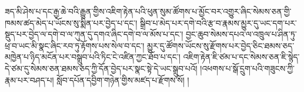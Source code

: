 ཟད་མི་ཤེས་པ་དང་རྒྱ་ཆེ་བའི་རྒྱུན་གྱིས་འཇིག་རྟེན་པའི་ཕུན་སུམ་ཚོགས་པ་མྱོང་བར་འགྱུར་ཞིང་སེམས་ཅན་གྱི་ཁམས་ཚད་མེད་པ་ཡོངས་སུ་སྨིན་པར་བྱེད་པ་དང་། སྒྲིབ་པ་མེད་པར་དགེ་བའི་རྩ་བ་རྣམས་མྱུར་དུ་ཡང་དག་པར་སྡུད་པར་བྱེད་ལ་དགེ་བ་ལ་ཀུན་དུ་དགའ་ཞིང་དགེ་བ་ལ་མོས་པ་དང་། བྱང་ཆུབ་སེམས་དཔའ་ལ་འཁྲུལ་པ་ཤིན་ཏུ་ཕྲ་བ་ཡང་མི་སྣང་ཞིང་རབ་ཏུ་རྟོགས་པས་སེལ་བ་དང་། མྱུར་དུ་ཚོགས་ཡོངས་སུ་རྫོགས་པར་བྱེད་ཅིང་ཐམས་ཅད་མཁྱེན་པ་ཉིད་མངོན་པར་བསྒྲུབ་པའི་ཏིང་ངེ་འཛིན་ཀྱང་ཐོབ་པ་དང་། འཇིག་རྟེན་ཇི་ཙམ་པ་དང་སེམས་ཅན་ཇི་སྙེད་དེ་ཙམ་དུ་སེམས་ཅན་ཐམས་ཅད་ཀྱི་དོན་བྱེད་པར་སྣང་སྟེ་དེ་ཡང་སྒྲུབ་པའོ། །འཕགས་པ་སྒོ་དྲུག་པའི་གཟུངས་ཀྱི་རྣམ་པར་བཤད་པ། སློབ་དཔོན་དབྱིག་གཉེན་གྱིས་མཛད་པ་རྫོགས་སོ། །